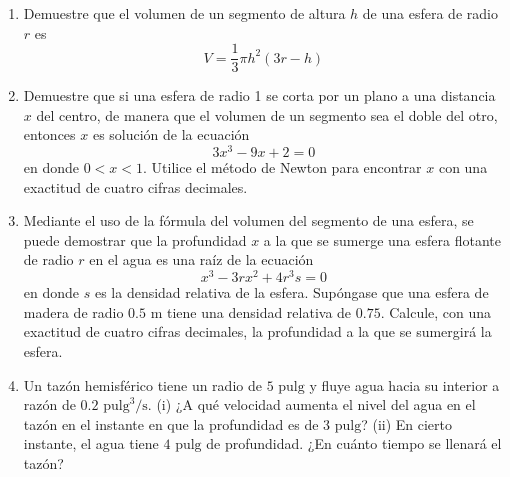 \item 
\begin{enumerate}
    \item[(a)] Demuestre que el volumen de un segmento de altura $h$ de una esfera de radio $r$ es
    $$V = \frac{1}{3}\pi h^2(3r - h)$$
    \item[(b)] Demuestre que si una esfera de radio 1 se corta por un plano a una distancia $x$ del centro, de manera que el volumen de un segmento sea el doble del otro, entonces $x$ es solución de la ecuación
    $$3x^3 - 9x + 2 = 0$$
    en donde $0 < x < 1$. Utilice el método de Newton para encontrar $x$ con una exactitud de cuatro cifras decimales.
    \item[(c)] Mediante el uso de la fórmula del volumen del segmento de una esfera, se puede demostrar que la profundidad $x$ a la que se sumerge una esfera flotante de radio $r$ en el agua es una raíz de la ecuación
    $$x^3 - 3rx^2 + 4r^3s = 0$$
    en donde $s$ es la densidad relativa de la esfera. Supóngase que una esfera de madera de radio $0.5 \text{ m}$ tiene una densidad relativa de $0.75$. Calcule, con una exactitud de cuatro cifras decimales, la profundidad a la que se sumergirá la esfera.
    \item[(d)] Un tazón hemisférico tiene un radio de $5 \text{ pulg}$ y fluye agua hacia su interior a razón de $0.2 \text{ pulg}^3/\text{s}$.
    (i) ¿A qué velocidad aumenta el nivel del agua en el tazón en el instante en que la profundidad es de $3 \text{ pulg}$?
    (ii) En cierto instante, el agua tiene $4 \text{ pulg}$ de profundidad. ¿En cuánto tiempo se llenará el tazón?
\end{enumerate}
\begin{center}
\end{center}
